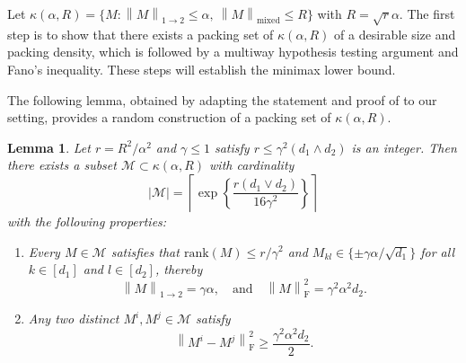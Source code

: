 \documentclass[11pt]{article}
\newtheorem{lemma}{Lemma}[section]
\newcommand{\norm}[1]{\left \|#1 \right \|}
\begin{document}
Let $\kappa(\alpha, R) = \{M : \norm{M}_{1\to 2} \leq \alpha, ~ \norm{M}_\mathrm{mixed} \leq R\}$ with $R = \sqrt{r} \alpha$. 
The first step is to show that there exists a packing set of $\kappa(\alpha, R)$ of a desirable size and packing density, 
which is followed by a multiway hypothesis testing argument and Fano's inequality. 
These steps will establish the minimax lower bound. 

The following lemma, obtained by adapting the statement and proof of \cite[Lemma 3.1]{cai2016matrix} to our setting, provides a random construction of a packing set of $\kappa(\alpha,R)$.
\begin{lemma} 
Let $r = R^2/\alpha^2$ and $\gamma \leq 1$ satisfy $r \leq \gamma^2 (d_1 \wedge d_2)$ is an integer. Then there exists a subset $\mathcal{M} \subset \kappa(\alpha, R)$ with cardinality 
\[ 
|\mathcal{M}| = \left\lceil \exp \left\{ \frac{r(d_1 \vee d_2)}{16 \gamma^2} \right\} \right\rceil 
\] 
with the following properties:
\begin{enumerate}
    \item Every $M \in \mathcal{M}$ satisfies that $\mathrm{rank}(M) \leq r/\gamma^2$ and $M_{kl} \in \{ \pm \gamma \alpha/\sqrt{d_1} \}$ for all $k \in [d_1]$ and $l \in [d_2]$, thereby
    \[ 
    \norm{M}_{1 \rightarrow 2} = \gamma \alpha, \quad \text{and} \quad
    \norm{M}_\mathrm{F}^2 = \gamma^2 \alpha^2 d_2.
    \]

    \item Any two distinct $M^i, M^j \in \mathcal{M}$ satisfy
    \[ 
    \norm{M^i - M^j}_\mathrm{F}^2 
    \geq \frac{\gamma^2 \alpha^2d_2}{2}.
    \]
\end{enumerate}
\label{lm:pack_set}
\end{lemma}
\end{document}

